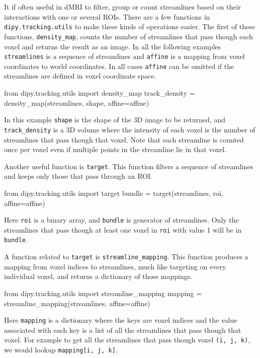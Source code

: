 \documentclass{bioinfo}
\begin{document}
It if often useful in dMRI to filter, group or count streamlines based on their
interactions with one or several ROIs. There are a few functions in
\texttt{dipy.tracking.utils} to make these kinds of operations easier. The
first of these functions, \texttt{density\_map}, counts the number of
streamlines that pass though each voxel and returns the result as an image. In
all the following examples \texttt{streamlines} is a sequence of streamlines and
\texttt{affine} is a mapping from voxel coordinates to world coordinates. In all
cases \texttt{affine} can be omitted if the streamlines
are defined in voxel coordinate space.
\begin{python}
from dipy.tracking.utils import density_map
track_density = density_map(streamlines, shape,
                            affine=affine)
\end{python}
In this example \texttt{shape} is the shape of the 3D image to be returned, and
\texttt{track\_density} is a 3D volume where the intensity of each voxel is the
number of streamlines that pass though that voxel. Note that
each streamline is counted once per voxel even if multiple points in the
streamline lie in that voxel.

Another useful function is \texttt{target}. This function filters a sequence of
streamlines and keeps only those that pass through an ROI.
\begin{python}
from dipy.tracking.utils import target
bundle = target(streamlines, roi, affine=affine)
\end{python}
Here \texttt{roi} is a binary array, and \texttt{bundle} is generator of
streamlines.  Only the streamlines that pass though at least
one voxel in \texttt{roi} with value 1 will be in \texttt{bundle}.

A function related to \texttt{target} is \texttt{streamline\_mapping}. This
function produces a mapping from voxel indices to streamlines, much like targeting
on every individual voxel, and returns a dictionary of those mappings.
\begin{python}
from dipy.tracking.utils import streamline_mapping
mapping = streamline_mapping(streamlines,
                             affine=affine)
\end{python}
Here \texttt{mapping} is a dictionary where the keys are voxel indices and
the value associated with each key is a list of all the streamlines that pass though that voxel. For example to get all the
streamlines that pass though voxel \texttt{(i, j, k)}, we would lookup
\texttt{mapping[i, j, k]}.
\end{document}
